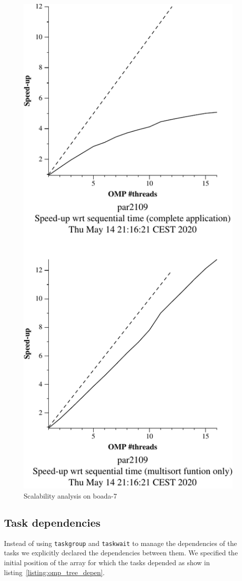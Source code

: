 \begin{figure}[H]
\begin{minipage}{0.5\textwidth}
        \includegraphics[width=0.7\linewidth]{plots/new-omp-tree-cutoff_boada7-crop.pdf}
        \caption{Scalability analysis on boada-7}
        \label{fig:cutoffboada7} 
    \end{minipage}
\end{figure}

\subsection{Task dependencies}

Instead of using \texttt{taskgroup} and \texttt{taskwait} to manage the dependencies of the tasks we
explicitly declared the dependencies between them. We specified the initial position of the array for which
the tasks depended as show in listing~\ref{listing:omp_tree_depen}.

